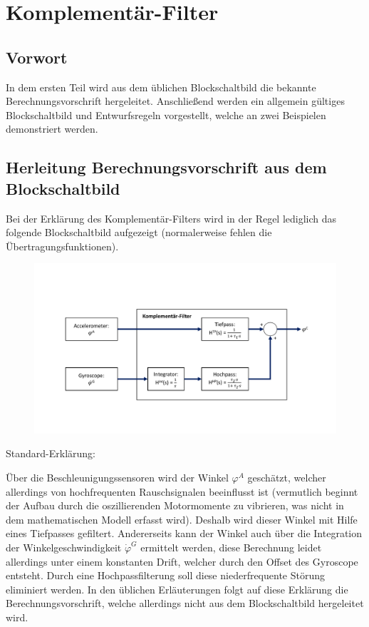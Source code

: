 \documentclass{article}
\begin{document}
\section{Komplementär-Filter}
\subsection{Vorwort}
In dem ersten Teil wird aus dem üblichen Blockschaltbild die bekannte Berechnungsvorschrift hergeleitet. Anschließend werden ein allgemein gültiges Blockschaltbild und Entwurfsregeln vorgestellt, welche an zwei Beispielen demonstriert werden.

\subsection{Herleitung Berechnungsvorschrift aus dem Blockschaltbild}
Bei der Erklärung des Komplementär-Filters wird in der Regel lediglich das folgende Blockschaltbild aufgezeigt (normalerweise fehlen die Übertragungsfunktionen). 

\begin{figure}[!h]
\includegraphics[scale=0.5,trim={0 3cm 0 4cm},clip]{Komp_CuBa_1D}

\end{figure}

Standard-Erklärung: 

Über die Beschleunigungssensoren wird der Winkel $\varphi^A$ geschätzt, welcher allerdings von hochfrequenten Rauschsignalen beeinflusst ist (vermutlich beginnt der Aufbau durch die oszillierenden Motormomente zu vibrieren, was nicht in dem mathematischen Modell erfasst wird). Deshalb wird dieser Winkel mit Hilfe eines Tiefpasses gefiltert. Andererseits kann der Winkel auch über die Integration der Winkelgeschwindigkeit $\dot{\varphi}^G$ ermittelt werden, diese Berechnung leidet allerdings unter einem konstanten Drift, welcher durch den Offset des Gyroscope entsteht. Durch eine Hochpassfilterung soll diese niederfrequente Störung eliminiert werden. 
In den üblichen Erläuterungen folgt auf diese Erklärung die Berechnungsvorschrift, welche allerdings nicht aus dem Blockschaltbild hergeleitet wird.
\end{document}
